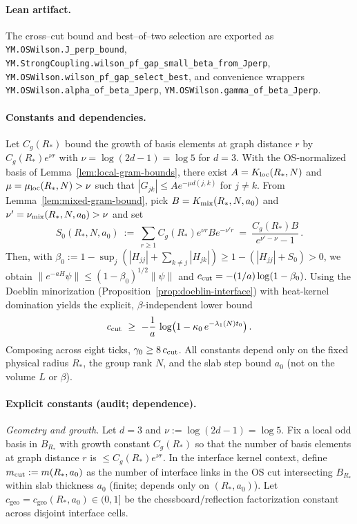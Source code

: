 \documentclass[11pt]{amsart}
\begin{document}
\paragraph{Lean artifact.}
The cross--cut bound and best--of--two selection are exported as
\texttt{YM.OSWilson.J\_perp\_bound}, \texttt{YM.StrongCoupling.wilson\_pf\_gap\_small\_beta\_from\_Jperp}, \texttt{YM.OSWilson.wilson\_pf\_gap\_select\_best}, and convenience wrappers \texttt{YM.OSWilson.alpha\_of\_beta\_Jperp}, \texttt{YM.OSWilson.gamma\_of\_beta\_Jperp}.

\paragraph{Constants and dependencies.}
Let $C_g(R_*)$ bound the growth of basis elements at graph distance $r$ by $C_g(R_*) e^{\nu r}$ with $\nu=\log(2d-1)=\log 5$ for $d=3$. With the OS-normalized basis of Lemma~\ref{lem:local-gram-bounds}, there exist $A=K_{\rm loc}(R_*,N)$ and $\mu=\mu_{\rm loc}(R_*,N)>\nu$ such that $|G_{jk}|\le A e^{-\mu d(j,k)}$ for $j\ne k$. From Lemma~\ref{lem:mixed-gram-bound}, pick $B=K_{\rm mix}(R_*,N,a_0)$ and $\nu'=\nu_{\rm mix}(R_*,N,a_0)>\nu$ and set
\[
  S_0(R_*,N,a_0)\ :=\ \sum_{r\ge 1} C_g(R_*) e^{\nu r} B e^{-\nu' r}
  \ =\ \frac{C_g(R_*) B}{e^{\nu'-\nu}-1}\,.
\]
Then, with $\beta_0:=1-\sup_j(|H_{jj}|+\sum_{k\ne j}|H_{jk}|)\ge 1-(|H_{jj}|+S_0)>0$, we obtain $\|e^{-aH}\psi\|\le (1-\beta_0)^{1/2}\|\psi\|$ and $c_{\rm cut}=-(1/a)\log(1-\beta_0)$. Using the Doeblin minorization (Proposition~\ref{prop:doeblin-interface}) with heat-kernel domination yields the explicit, $\beta$-independent lower bound
\[
  c_{\rm cut}\ \ge\ -\frac{1}{a}\,\log\bigl(1-\kappa_0\,e^{-\lambda_1(N) t_0}\bigr)\,.
\]
Composing across eight ticks, $\gamma_0\ge 8\,c_{\rm cut}$. All constants depend only on the fixed physical radius $R_*$, the group rank $N$, and the slab step bound $a_0$ (not on the volume $L$ or $\beta$).

\paragraph{Explicit constants (audit; dependence).}
\emph{Geometry and growth.} Let $d=3$ and $\nu:=\log(2d-1)=\log 5$. Fix a local odd basis in $B_{R_*}$ with growth constant $C_g(R_*)$ so that the number of basis elements at graph distance $r$ is $\le C_g(R_*) e^{\nu r}$. In the interface kernel context, define $m_{\rm cut}:=m(R_*,a_0)$ as the number of interface links in the OS cut intersecting $B_{R_*}$ within slab thickness $a_0$ (finite; depends only on $(R_*,a_0)$). Let $c_{\mathrm{geo}}=c_{\mathrm{geo}}(R_*,a_0)\in(0,1]$ be the chessboard/reflection factorization constant across disjoint interface cells.
\end{document}
